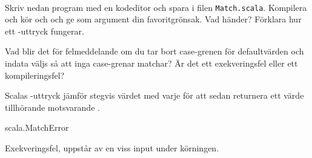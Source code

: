 \ExerciseSolution{\ExeWeekSIX}

\BasicTasks %

\fi





\QUESTBEGIN

\Task \label{task:vegomatch} \what~   %

\Subtask \label{subtask:vegomatch} Skriv nedan program med en kodeditor och spara i filen \texttt{Match.scala}. Kompilera och kör och och ge som argument din favoritgrönsak. Vad händer? Förklara hur ett -uttryck fungerar.


\Subtask Vad blir det för felmeddelande om du tar bort case-grenen för defaultvärden och indata väljs så att inga case-grenar matchar? Är det ett exekveringsfel eller ett kompileringsfel?




\SOLUTION


\TaskSolved \what


\SubtaskSolved  %
Scalas -uttryck jämför stegvis värdet med varje  för att sedan returnera ett värde tillhörande motsvarande .

\SubtaskSolved  \begin{REPL}
scala.MatchError 
\end{REPL}
Exekveringsfel, uppstår av en viss input under körningen.




